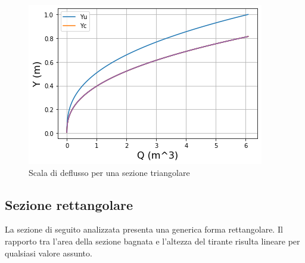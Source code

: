\documentclass[12pt]{article} %
\begin{document}
\begin{figure}[H]
    \centering
    \includegraphics[scale=0.8]{deflussotri.png}
    \caption{Scala di deflusso per una sezione triangolare}
    \label{fig:triangolare_scala_deflusso}
\end{figure}


\subsection{Sezione rettangolare}

\noindent La sezione di seguito analizzata presenta una generica forma rettangolare.
Il rapporto tra l’area della sezione bagnata e l’altezza del tirante risulta lineare per qualsiasi valore assunto.
\end{document}
